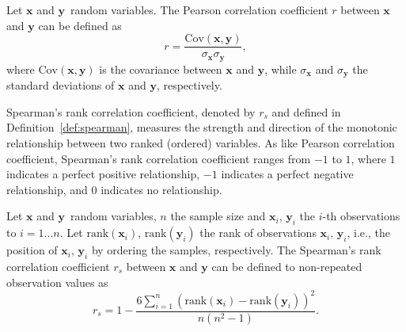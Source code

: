 \begin{definition}\label{def:pearson}
Let  $\mathbf{x}$ and $\mathbf{y}$\ random variables. The Pearson correlation coefficient $r$ between $\mathbf{x}$ and $\mathbf{y}$ can be defined as  
\begin{equation}
r = \frac{\mathrm{Cov}(\mathbf{x}, \mathbf{y})}{\sigma_\mathbf{x} \sigma_\mathbf{y}},
\end{equation}
where $\mathrm{Cov}(\mathbf{x}, \mathbf{y})$ is the covariance between $\mathbf{x}$ and $\mathbf{y}$, while $\sigma_\mathbf{x}$ and $\sigma_\mathbf{y}$ the standard deviations of $\mathbf{x}$ and $\mathbf{y}$, respectively. 
\end{definition}

Spearman's rank correlation coefficient, denoted by $r_s$ and defined in Definition~\ref{def:spearman}, measures the strength and direction of the monotonic relationship between two ranked (ordered) variables.  As like Pearson correlation coefficient, Spearman's rank correlation coefficient ranges from $-1$ to $1$, where $1$ indicates a perfect positive relationship, $-1$ indicates a perfect negative relationship, and $0$ indicates no relationship.

\begin{definition}\label{def:spearman}
Let $\mathbf{x}$ and $\mathbf{y}$\ random variables, $n$ the sample size and $\mathbf{x}_i, \, \mathbf{y}_i$ the $i$-th observations to $i = 1 \ldots n$. Let $\mathrm{rank}(\mathbf{x}_i), \, \mathrm{rank}(\mathbf{y}_i)$ the rank of observations $\mathbf{x}_i, \, \mathbf{y}_i$, i.e., the position of $\mathbf{x}_i, \, \mathbf{y}_i$ by ordering the samples, respectively. The Spearman's rank correlation coefficient $r_s$ between $\mathbf{x}$ and $\mathbf{y}$ can be defined to non-repeated observation values as 
\begin{equation}\label{eq:spearman}
r_s = 1 - \frac{6 \sum\limits_{i=1}^{n}(\mathrm{rank}(\mathbf{x}_i) - \mathrm{rank}(\mathbf{y}_i))^2}{n(n^2 - 1)}.
\end{equation}
\end{definition}

